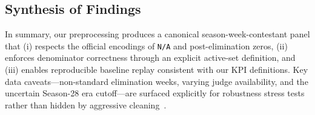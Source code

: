 \subsection{Synthesis of Findings}
\label{subsec:synthesis_findings}

In summary, our preprocessing produces a canonical season-week-contestant panel that
(i) respects the official encodings of \texttt{N/A} and post-elimination zeros,
(ii) enforces denominator correctness through an explicit active-set definition, and
(iii) enables reproducible baseline replay consistent with our KPI definitions.
Key data caveats---non-standard elimination weeks, varying judge availability, and the uncertain Season-28 era cutoff---are surfaced
explicitly for robustness stress tests rather than hidden by aggressive cleaning~\cite{comap2026_problemC_pdf}.
